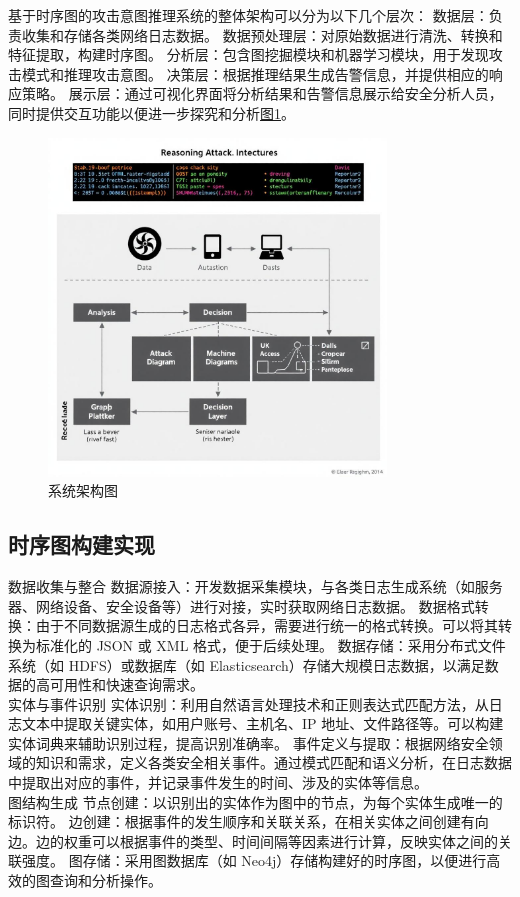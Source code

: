 \documentclass{article} %
\begin{document}
	基于时序图的攻击意图推理系统的整体架构可以分为以下几个层次：
	数据层：负责收集和存储各类网络日志数据。
	数据预处理层：对原始数据进行清洗、转换和特征提取，构建时序图。
	分析层：包含图挖掘模块和机器学习模块，用于发现攻击模式和推理攻击意图。
	决策层：根据推理结果生成告警信息，并提供相应的响应策略。
	展示层：通过可视化界面将分析结果和告警信息展示给安全分析人员，同时提供交互功能以便进一步探究和分析\hyperref[fig:system_figure]{图1}。
	\begin{figure}[h]
		\begin{center}
			\includegraphics[width=0.8\textwidth]{system.jpg}
			\caption{系统架构图}
			\label{fig:system_figure}
		\end{center}
	\end{figure}
	
	\subsection{时序图构建实现}
	
	数据收集与整合
	数据源接入：开发数据采集模块，与各类日志生成系统（如服务器、网络设备、安全设备等）进行对接，实时获取网络日志数据。
	数据格式转换：由于不同数据源生成的日志格式各异，需要进行统一的格式转换。可以将其转换为标准化的 JSON 或 XML 格式，便于后续处理。
	数据存储：采用分布式文件系统（如 HDFS）或数据库（如 Elasticsearch）存储大规模日志数据，以满足数据的高可用性和快速查询需求。\\
	实体与事件识别
	实体识别：利用自然语言处理技术和正则表达式匹配方法，从日志文本中提取关键实体，如用户账号、主机名、IP 地址、文件路径等。可以构建实体词典来辅助识别过程，提高识别准确率。
	事件定义与提取：根据网络安全领域的知识和需求，定义各类安全相关事件。通过模式匹配和语义分析，在日志数据中提取出对应的事件，并记录事件发生的时间、涉及的实体等信息。\\
	图结构生成
	节点创建：以识别出的实体作为图中的节点，为每个实体生成唯一的标识符。
	边创建：根据事件的发生顺序和关联关系，在相关实体之间创建有向边。边的权重可以根据事件的类型、时间间隔等因素进行计算，反映实体之间的关联强度。
	图存储：采用图数据库（如 Neo4j）存储构建好的时序图，以便进行高效的图查询和分析操作。
	
\end{document}
